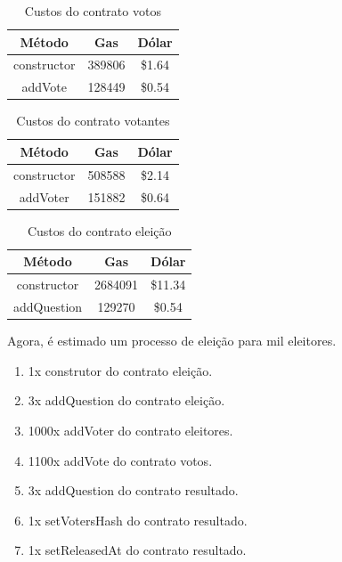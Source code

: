 \documentclass{ufsctex/ufsctex}
\begin{document}
\begin{table}[htb]
\centering
\begin{tabular}{||c|c|c||}
		\hline
		\textbf{Método} & \textbf{Gas} & \textbf{Dólar}  \\ [0.2ex] \hline \hline
		constructor & 389806 & \$1.64 \\ 
		addVote     & 128449 & \$0.54 \\ \hline
	\end{tabular}
	\caption{Custos do contrato votos}
	\label{tab:my-table}
\end{table}

\begin{table}[htb]
	\centering
	\begin{tabular}{||c|c|c||}
		\hline
		\textbf{Método}  & \textbf{Gas} & \textbf{Dólar}  \\ [0.2ex] \hline \hline
		constructor & 508588 & \$2.14 \\ 
		addVoter    & 151882 & \$0.64 \\ \hline
	\end{tabular}
	\caption{Custos do contrato votantes}
	\label{tab:my-table}
\end{table}

\begin{table}[htb]
	\centering
	\begin{tabular}{||c|c|c||}
		\hline
		\textbf{Método} & \textbf{Gas}  & \textbf{Dólar}   \\ [0.2ex] \hline \hline
		constructor & 2684091 & \$11.34 \\ 
		addQuestion & 129270  & \$0.54  \\ \hline
	\end{tabular}
	\caption{Custos do contrato eleição}
	\label{tab:my-table}
\end{table}

Agora, é estimado um processo de eleição para mil eleitores.

\begin{enumerate}
	\item 1x construtor do contrato eleição.
	\item 3x addQuestion do contrato eleição.
	\item 1000x addVoter do contrato eleitores.
	\item 1100x addVote do contrato votos.
	\item 3x addQuestion do contrato resultado.
	\item 1x setVotersHash do contrato resultado.
	\item 1x setReleasedAt do contrato resultado.
\end{enumerate}
\end{document}

